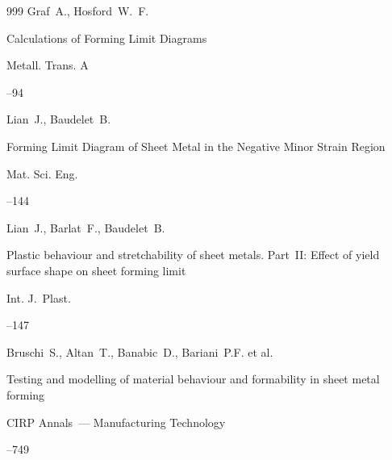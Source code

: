 \begin{thebibliography}{999}
\by Graf~A., Hosford~W.~F. 

\paper Calculations of Forming Limit Diagrams

\jour Metall. Trans. A




–94






\by Lian~J., Baudelet~B. 

\paper Forming Limit Diagram of Sheet Metal in the Negative Minor Strain Region

\jour Mat. Sci. Eng. 



--144





\by Lian~J., Barlat~F., Baudelet~B. 

\paper Plastic behaviour and stretchability of sheet metals. Part~II: Effect of yield surface shape on sheet forming limit

\jour Int. J.~Plast.  




--147






\by Bruschi~S.,  Altan~T., Banabic~D., Bariani~P.F. et al.

\paper Testing and modelling of material behaviour and formability in sheet metal forming

\jour CIRP Annals~--- Manufacturing Technology




--749



\end{thebibliography}
